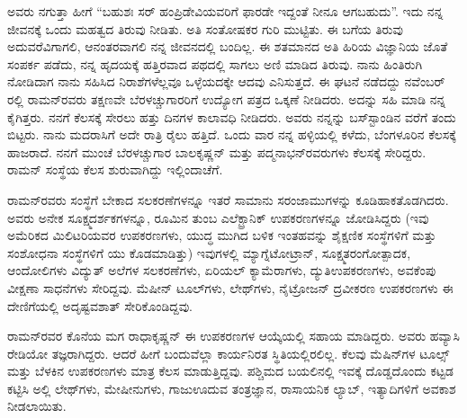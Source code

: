 ಅವರು ನಗುತ್ತಾ ಹೀಗೆ\enginline{-} “ಬಹುಶಃ ಸರ್ ಹಂಪ್ರಿಡೇವಿಯವರಿಗೆ ಫಾರಡೇ ಇದ್ದಂತೆ ನೀನೂ ಆಗಬಹುದು”. ಇದು ನನ್ನ ಜೀವನಕ್ಕೆ ಒಂದು ಮಹತ್ವದ ತಿರುವು ನೀಡಿತು. ಅತಿ ಸಂತೋಷಕರ ಗುರಿ ಮುಟ್ಟಿತು. ಈ ಬಗೆಯ ತಿರುವು ಅದುವರೆವಿಗಾಗಲಿ, ಆನಂತರವಾಗಲಿ ನನ್ನ ಜೀವನದಲ್ಲಿ ಬಂದಿಲ್ಲ. ಈ ಶತಮಾನದ ಅತಿ ಹಿರಿಯ ವಿಜ್ಞಾನಿಯ ಜೊತೆ ಸಂಪರ್ಕ ಪಡೆದು, ನನ್ನ ಹೃದಯಕ್ಕೆ ಹತ್ತಿರವಾದ ಪಥದಲ್ಲಿ ಸಾಗಲು ಅಣಿ ಮಾಡಿದ ತಿರುವು. ನಾನು ಹಿಂತಿರುಗಿ ನೋಡಿದಾಗ ನಾನು ಸಹಿಸಿದ ನಿರಾಶೆಗಳೆಲ್ಲವೂ ಒಳ್ಳೆಯದಕ್ಕೇ ಆದವು ಎನಿಸುತ್ತದೆ. ಈ ಘಟನೆ ನಡೆದದ್ದು ನವೆಂಬರ್ ರಲ್ಲಿ ರಾಮನ್‍ರವರು ತಕ್ಷಣವೇ ಬೆರಳಚ್ಚುಗಾರರಿಗೆ ಉದ್ಯೋಗ ಪತ್ರದ ಒಕ್ಕಣೆ ನೀಡಿದರು. ಅದನ್ನು ಸಹಿ ಮಾಡಿ ನನ್ನ ಕೈಗಿತ್ತರು. ನನಗೆ ಕೆಲಸಕ್ಕೆ ಸೇರಲು ಹತ್ತು ದಿನಗಳ ಕಾಲಾವಧಿ ನೀಡಿದರು. ಅವರು ನನ್ನನ್ನು ಬಸ್‍ಸ್ಟಾಂಡಿನ ವರೆಗೆ ತಂದು ಬಿಟ್ಟರು. ನಾನು ಮದರಾಸಿಗೆ ಅದೇ ರಾತ್ರಿ ರೈಲು ಹತ್ತಿದೆ. ಒಂದು ವಾರ ನನ್ನ ಹಳ್ಳಿಯಲ್ಲಿ ಕಳೆದು, ಬೆಂಗಳೂರಿನ ಕೆಲಸಕ್ಕೆ ಹಾಜರಾದೆ. ನನಗೆ ಮುಂಚೆ ಬೆರಳಚ್ಚುಗಾರ ಬಾಲಕೃಷ್ಣನ್ ಮತ್ತು ಪದ್ಮನಾಭನ್‍ರವರುಗಳು ಕೆಲಸಕ್ಕೆ ಸೇರಿದ್ದರು. ರಾಮನ್ ಸಂಸ್ಥೆಯ ಕೆಲಸ ಶುರುವಾಗಿದ್ದು ಇಲ್ಲಿಂದಾಚೆಗೆ.

ರಾಮನ್‍ರವರು ಸಂಸ್ಥೆಗೆ ಬೇಕಾದ ಸಲಕರಣೆಗಳನ್ನೂ ಇತರೆ ಸಾಮಾನು ಸರಂಜಾಮುಗಳನ್ನು ಕೂಡಿಹಾಕತೊಡಗಿದರು. ಅವರು ಅನೇಕ ಸೂಕ್ಷ್ಮದರ್ಶಕಗಳನ್ನೂ, ರೂಮಿನ ತುಂಬ ಎಲೆಕ್ಟ್ರಾನಿಕ್ ಉಪಕರಣಗಳನ್ನೂ ಜೋಡಿಸಿದ್ದರು (ಇವು ಅಮೆರಿಕದ ಮಿಲಿಟರಿಯವರ ಉಪಕರಣಗಳು, ಯುದ್ಧ ಮುಗಿದ ಬಳಿಕ ಇಂತಹವನ್ನು ಶೈಕ್ಷಣಿಕ ಸಂಸ್ಥೆಗಳಿಗೆ ಮತ್ತು ಸಂಶೋಧನಾ ಸಂಸ್ಥೆಗಳಿಗೆ ಯು ಕೊಡಮಾಡಿತ್ತು) ಇವುಗಳಲ್ಲಿ ಮ್ಯಾಗ್ನೆಟೋಟ್ರಾನ್, ಸೂಕ್ಷ್ಮತರಂಗೋತ್ಪಾದಕ, ಆಂದೋಲಿಗಳು ವಿದ್ಯುತ್ ಅಲೆಗಳ ಸಲಕರಣೆಗಳು, ಏರಿಯಲ್ ಕ್ಯಾಮೆರಾಗಳು, ದ್ಯುತಿಉಪಕರಣಗಳು, ಅವಕೆಂಪು ವೀಕ್ಷಣಾ ಸಾಧನೆಗಳು ಸೇರಿದ್ದವು. ಮೆಷೀನ್ ಟೂಲ್‍ಗಳು, ಲೇಥ್‍ಗಳು, ನೈಟ್ರೋಜನ್ ದ್ರವೀಕರಣ ಉಪಕರಣಗಳು ಈ ದೇಣಿಗೆಯಲ್ಲಿ ಅದೃಷ್ಟವಶಾತ್ ಸೇರಿಕೊಂಡಿದ್ದವು.

ರಾಮನ್‍ರವರ ಕೊನೆಯ ಮಗ ರಾಧಾಕೃಷ್ಣನ್ ಈ ಉಪಕರಣಗಳ ಆಯ್ಕೆಯಲ್ಲಿ ಸಹಾಯ ಮಾಡಿದ್ದರು. ಅವರು ಹವ್ಯಾಸಿ ರೇಡಿಯೋ ತಜ್ಞರಾಗಿದ್ದರು. ಆದರೆ ಹೀಗೆ ಬಂದುವೆಲ್ಲಾ ಕಾರ್ಯನಿರತ ಸ್ಥಿತಿಯಲ್ಲಿರಲಿಲ್ಲ. ಕೆಲವು ಮೆಷಿನ್‍ಗಳ ಟೂಲ್ಸ್ ಮತ್ತು ಬೆಳಕಿನ ಉಪಕರಣಗಳು ಮಾತ್ರ ಕೆಲಸ ಮಾಡುತ್ತಿದ್ದವು. ಪಶ್ಚಿಮದ ಬಯಲಿನಲ್ಲಿ ಇವಕ್ಕೆ ದೊಡ್ಡದೊಂದು ಕಟ್ಟಡ ಕಟ್ಟಿಸಿ ಅಲ್ಲಿ ಲೇಥ್‍ಗಳು, ಮೇಷೀನುಗಳು, ಗಾಜುಊದುವ ತಂತ್ರಜ್ಞಾನ, ರಾಸಾಯನಿಕ ಲ್ಯಾಬ್, ಇತ್ಯಾದಿಗಳಿಗೆ ಅವಕಾಶ ನೀಡಲಾಯಿತು.

